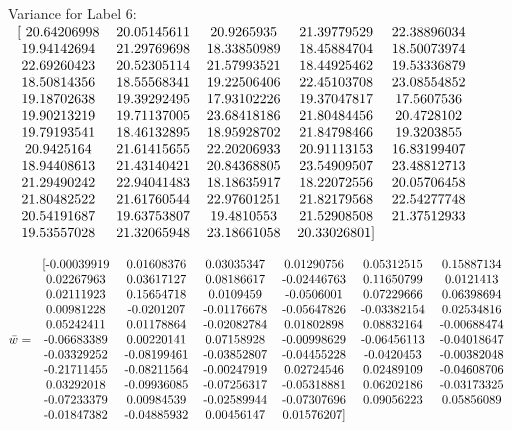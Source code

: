 \documentclass[a4paper]{article}
\begin{document}
Variance for Label 6: 
$\begin{tabular}{  c c c c c  }
    [ 20.64206998 & 20.05145611 & 20.9265935  & 21.39779529 & 22.38896034 \\
      19.94142694 & 21.29769698 & 18.33850989 & 18.45884704 & 18.50073974 \\
      22.69260423 & 20.52305114 & 21.57993521 & 18.44925462 & 19.53336879 \\
      18.50814356 & 18.55568341 & 19.22506406 & 22.45103708 & 23.08554852 \\
      19.18702638 & 19.39292495 & 17.93102226 & 19.37047817 & 17.5607536 \\
      19.90213219 & 19.71137005 & 23.68418186 & 21.80484456 & 20.4728102 \\
      19.79193541 & 18.46132895 & 18.95928702 & 21.84798466 & 19.3203855 \\
      20.9425164  & 21.61415655 & 22.20206933 & 20.91113153 & 16.83199407 \\
      18.94408613 & 21.43140421 & 20.84368805 & 23.54909507 & 23.48812713 \\
      21.29490242 & 22.94041483 & 18.18635917 & 18.22072556 & 20.05706458 \\
      21.80482522 & 21.61760544 & 22.97601251 & 21.82179568 & 22.54277748 \\
      20.54191687 & 19.63753807 & 19.4810553  & 21.52908508 & 21.37512933 \\
      19.53557028 & 21.32065948 & 23.18661058 & 20.33026801]& \\
\end{tabular}$

\vspace{3mm}

$\bar{w} =
	\begin{tabular}{  c c c c c c  } 
		[-0.00039919 &  0.01608376 &  0.03035347 &  0.01290756 &  0.05312515 &  0.15887134 \\
		  0.02267963 &  0.03617127 &  0.08186617 & -0.02446763 &  0.11650799 &  0.0121413 \\
		  0.02111923 &  0.15654718 &  0.0109459  & -0.0506001  &  0.07229666 &  0.06398694 \\
		  0.00981228 & -0.0201207  & -0.01176678 & -0.05647826 & -0.03382154 &  0.02534816 \\
		  0.05242411 &  0.01178864 & -0.02082784 &  0.01802898 &  0.08832164 & -0.00688474 \\
		 -0.06683389 &  0.00220141 &  0.07158928 & -0.00998629 & -0.06456113 & -0.04018647 \\
		 -0.03329252 & -0.08199461 & -0.03852807 & -0.04455228 & -0.0420453  & -0.00382048 \\
		 -0.21711455 & -0.08211564 & -0.00247919 &  0.02724546 &  0.02489109 & -0.04608706 \\
		  0.03292018 & -0.09936085 & -0.07256317 & -0.05318881 &  0.06202186 & -0.03173325 \\
		 -0.07233379 &  0.00984539 & -0.02589944 & -0.07307696 &  0.09056223 &  0.05856089 \\
		 -0.01847382 & -0.04885932 &  0.00456147 &  0.01576207] & & \\
	\end{tabular}$
\end{document}
